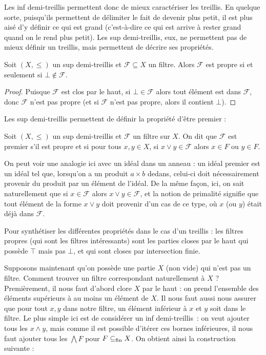 Les inf demi-treillis permettent donc de mieux caractériser les treillis. En
quelque sorte, puisqu'ils permettent de délimiter le fait de devenir plus petit,
il est plus aisé d'y définir ce qui est grand (c'est-à-dire ce qui est arrive à
rester grand quand on le rend plus petit). Les sup demi-treillis, eux, ne
permettent pas de mieux définir un treillis, mais permettent de décrire ses
propriétés.

\begin{property}
  Soit $(X,\leq)$ un sup demi-treillis et $\mathcal F \subseteq X$ un filtre.
  Alors $\mathcal F$ est propre si et seulement si $\bot\notin\mathcal F$.
\end{property}

\begin{proof}
  Puisque $\mathcal F$ est clos par le haut, si $\bot\in\mathcal F$ alors tout
  élément est dans $\mathcal F$, donc $\mathcal F$ n'est pas propre (et si
  $\mathcal F$ n'est pas propre, alors il contient $\bot$).
\end{proof}

Les sup demi-treillis permettent de définir la propriété d'être premier :

\begin{definition}
  Soit $(X,\leq)$ un sup demi-treillis et $\mathcal F$ un filtre sur $X$. On dit
  que $\mathcal F$ est premier s'il est propre et si pour tous $x,y\in X$, si
  $x\lor y \in \mathcal F$ alors $x\in F$ ou $y\in F$.
\end{definition}

On peut voir une analogie ici avec un idéal dans un anneau : un idéal premier
est un idéal tel que, lorsqu'on a un produit $a\times b$ dedans, celui-ci doit
nécessairement provenir du produit par un élément de l'idéal. De la même façon,
ici, on sait naturellement que si $x\in\mathcal F$ alors
$x\lor y \in\mathcal F$, et la notion de primalité signifie que tout élément de
la forme $x\lor y$ doit provenir d'un cas de ce type, où $x$ (ou $y$) était déjà
dans $\mathcal F$.

Pour synthétiser les différentes propriétés dans le cas d'un treillis : les
filtres propres (qui sont les filtres intéressants) sont les parties closes par
le haut qui possède $\top$ mais pas $\bot$, et qui sont closes par intersection
finie.

Supposons maintenant qu'on possède une partie $X$ (non vide) qui n'est pas un
filtre. Comment trouver un filtre correspondant naturellement à $X$ ?
Premièrement, il nous faut d'abord clore $X$ par le haut : on prend l'ensemble
des éléments supérieurs à au moins un élément de $X$. Il nous faut aussi nous
assurer que pour tout $x,y$ dans notre filtre, un élément inférieur à $x$ et $y$
soit dans le filtre. Le plus simple ici est de considérer un inf demi-treillis~:
on veut ajouter tous les $x\land y$, mais comme il est possible d'itérer ces
bornes inférieures, il nous faut ajouter tous les $\bigwedge F$ pour
$F\subseteq_{\mathrm{fin}} X$. On obtient ainsi la construction suivante :

